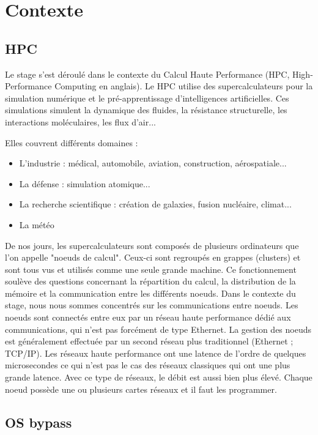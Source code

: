 \section{Contexte}

\subsection{HPC}

Le stage s'est déroulé dans le contexte du Calcul Haute Performance (HPC, High-Performance Computing en anglais).
Le HPC utilise des supercalculateurs pour la simulation numérique et le pré-apprentissage d'intelligences artificielles.
Ces simulations simulent la dynamique des fluides, la résistance structurelle, les interactions moléculaires, les flux d'air...

\bigskip

\noindent{}Elles couvrent différents domaines :
\begin{itemize}
  \item L'industrie : médical, automobile, aviation, construction, aérospatiale...
  \item La défense : simulation atomique...
  \item La recherche scientifique : création de galaxies, fusion nucléaire, climat...
  \item La météo
\end{itemize}

\bigskip

De nos jours, les supercalculateurs sont composés de plusieurs ordinateurs que l'on appelle "noeuds de calcul".
Ceux-ci sont regroupés en grappes (clusters) et sont tous vus et utilisés comme une seule grande machine.
Ce fonctionnement soulève des questions concernant la répartition du calcul, la distribution de la mémoire et la communication entre les différents noeuds.
Dans le contexte du stage, nous nous sommes concentrés sur les communications entre noeuds.
Les noeuds sont connectés entre eux par un réseau haute performance dédié aux communications, qui n'est pas forcément de type Ethernet.
La gestion des noeuds est généralement effectuée par un second réseau plus traditionnel (Ethernet ; TCP/IP).
Les réseaux haute performance ont une latence de l'ordre de quelques microsecondes ce qui n'est pas le cas des réseaux classiques qui ont une plus grande latence.
Avec ce type de réseaux, le débit est aussi bien plus élevé.
Chaque noeud possède une ou plusieurs cartes réseaux et il faut les programmer.

\subsection{OS bypass}

